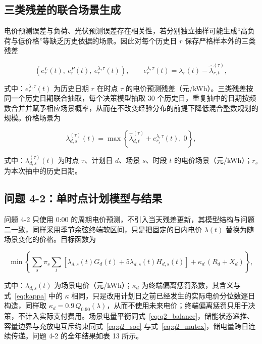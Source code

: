 \subsection{三类残差的联合场景生成}

电价预测误差与负荷、光伏预测误差存在相关性，若分别独立抽样可能生成``高负荷与低价格''等缺乏历史依据的场景。因此对每个历史日 $r$ 保存严格样本外的三类残差

\begin{equation}
  \left(e^L_r(t),\ e^P_r(t),\ e^{\lambda,\tau}_r(t)\right),
  \qquad
  e^{\lambda,\tau}_r(t) = \lambda_r(t) - \widehat\lambda^{(\tau)}_{r,t},
  \label{eq:q4_joint_res}
\end{equation}

式中：$e^{\lambda,\tau}_r(t)$ 为历史日期 $r$ 在时点 $\tau$ 的电价预测残差（元/kWh）。三类残差按同一个历史日期联合抽取，每个决策模型抽取 30 个历史日，重复抽中的日期按频数合并并赋予相应场景概率，从而在不改变经验分布的前提下降低混合整数规划的规模。价格场景为

\begin{equation}
  \lambda^{(\tau)}_{d,s}(t) = \max\left\{\widehat\lambda^{(\tau)}_{d,t} + e^{\lambda,\tau}_{r_s}(t),\ 0\right\},
  \label{eq:q4_price_scenario}
\end{equation}

式中：$\lambda^{(\tau)}_{d,s}(t)$ 为时点 $\tau$、计划日 $d$、场景 $s$、时段 $t$ 的电价场景（元/kWh）；$r_s$ 为本次抽中的历史日期。

\subsection{问题 4-2：单时点计划模型与结果}

问题 4-2 只使用 0:00 的周期电价预测，不引入当天残差更新，其模型结构与问题二一致，同样采用季节余弦终端软区间，只是把固定的日内电价 $\lambda(t)$ 替换为随场景变化的价格。目标函数为

\begin{equation}
  \min\left\{
    \sum_s \pi_s \sum_t\left[\lambda_{d,s}(t)G_d(t) + 5\lambda_{d,s}(t)H_{d,s}(t)\right]
    + \kappa_d\,(R_d + X_d)
  \right\},
  \label{eq:q4_obj2}
\end{equation}

式中：$\lambda_{d,s}(t)$ 为场景电价（元/kWh）；$\kappa_d$ 为终端偏离惩罚系数，其含义与式~\eqref{eq:kappa} 中的 $\kappa$ 相同，只是改用计划日之前已经发生的实际电价分位数逐日构造，同样取 $\kappa_d = 0.9\,Q_{0.90}(\lambda)$，从而不使用未来电价；终端偏离惩罚只用于决策，不计入实际支付费用。场景电量平衡同式~\eqref{eq:q2_balance}，储能状态递推、容量边界与充放电互斥约束同式~\eqref{eq:q2_soc} 与式~\eqref{eq:q2_mutex}，储电量跨日连续传递。问题 4-2 的全年结果如表 13 所示。

